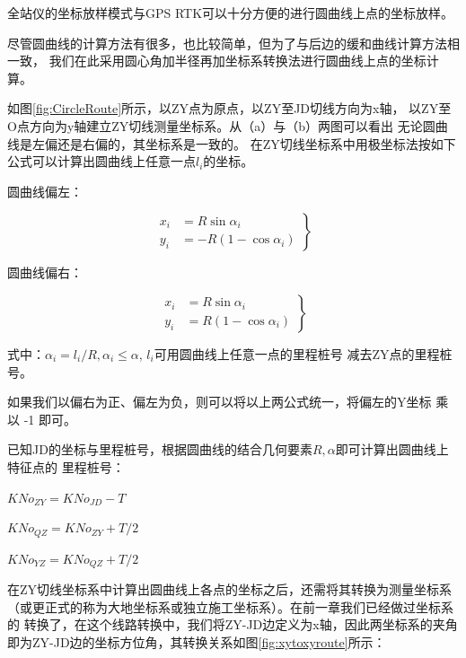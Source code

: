  全站仪的坐标放样模式与GPS RTK可以十分方便的进行圆曲线上点的坐标放样。

 尽管圆曲线的计算方法有很多，也比较简单，但为了与后边的缓和曲线计算方法相一致，
 我们在此采用圆心角加半径再加坐标系转换法进行圆曲线上点的坐标计算。

 如图\ref{fig:CircleRoute}所示，以ZY点为原点，以ZY至JD切线方向为x轴，
 以ZY至O点方向为y轴建立ZY切线测量坐标系。从（a）与（b）两图可以看出
无论圆曲线是左偏还是右偏的，其坐标系是一致的。
 在ZY切线坐标系中用极坐标法按如下公式可以计算出圆曲线上任意一点$l_i$的坐标。

圆曲线偏左：

\begin{equation}
\left . 
\begin{aligned}
x_{i} &= R \sin \alpha_i   \\
y_{i} &= -R(1- \cos \alpha_i)
\end{aligned}
\right \}
\end{equation}

圆曲线偏右：

\begin{equation}
\left . 
\begin{aligned}
x_{i} &= R \sin \alpha_i   \\
y_{i} &= R(1- \cos \alpha_i)
\end{aligned} 
\right \}
\end{equation}

式中：$\alpha_i = l_i / R,  \alpha_i \le \alpha $, $l_i$可用圆曲线上任意一点的里程桩号
减去ZY点的里程桩号。

如果我们以偏右为正、偏左为负，则可以将以上两公式统一，将偏左的Y坐标
乘以 -1 即可。

已知JD的坐标与里程桩号，根据圆曲线的结合几何要素$R, \alpha$即可计算出圆曲线上特征点的
里程桩号：

$KNo_{ZY} = KNo_{JD} - T$

$KNo_{QZ} = KNo_{ZY} + T/2$

$KNo_{YZ} = KNo_{QZ} + T/2$

在ZY切线坐标系中计算出圆曲线上各点的坐标之后，还需将其转换为测量坐标系
（或更正式的称为大地坐标系或独立施工坐标系）。在前一章我们已经做过坐标系的
转换了，在这个线路转换中，我们将ZY-JD边定义为x轴，因此两坐标系的夹角
即为ZY-JD边的坐标方位角，其转换关系如图\ref{fig:xytoxyroute}所示：

